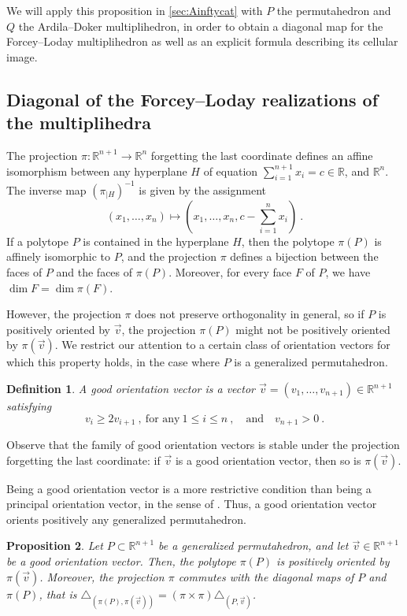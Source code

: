 \documentclass[twoside, 12pt]{amsart}
\newtheorem{definition}{Definition}[section]
\newtheorem{proposition}[definition]{Proposition}
\theoremstyle{remark}
\newcommand{\RR}{\mathbb{R}}
\begin{document}
We will apply this proposition in \cref{sec:Ainftycat} with $P$ the permutahedron and $Q$ the Ardila--Doker multiplihedron, in order to obtain a diagonal map for the Forcey--Loday multiplihedron as well as an explicit formula describing its cellular image.


\subsection{Diagonal of the Forcey--Loday realizations of the multiplihedra}
\label{sec:diagonal}

The projection $\pi : \RR^{n+1} \to \RR^n$ forgetting the last coordinate defines an affine isomorphism between any hyperplane $H$ of equation $\sum_{i=1}^{n+1} x_i = c \in \RR$, and $\RR^n$. 
The inverse map $(\pi_{| H})^{-1}$ is given by the assignment \[ (x_1, \ldots, x_n) \mapsto \left(x_1, \ldots, x_n, c- \sum_{i=1}^{n}x_i\right) \ . \]
If a polytope $P$ is contained in the hyperplane $H$, then the polytope $\pi(P)$ is affinely isomorphic to $P$, and the projection $\pi$ defines a bijection between the faces of $P$ and the faces of $\pi(P)$. Moreover, for every face $F$ of $P$, we have $\dim F = \dim \pi(F)$.

However, the projection $\pi$ does not preserve orthogonality in general, so if $P$ is positively oriented by $\vec v$, the projection $\pi(P)$ might not be positively oriented by $\pi(\vec v)$.  
We restrict our attention to a certain class of orientation vectors for which this property holds, in the case where $P$ is a generalized permutahedron.

\begin{definition} 
\label{def:goodvector}
A \emph{good orientation vector} is a vector $\vec v=(v_1, \ldots, v_{n+1})\in \RR^{n+1}$ satisfying \[v_{i}\geqslant2v_{i+1}\ , \ \text{for any}\  1\leqslant i\leqslant n\ , \quad \text{and}\quad  v_{n+1}>0 \ . \]
\end{definition}
Observe that the family of good orientation vectors is stable under the projection forgetting the last coordinate: if $\vec v$ is a good orientation vector, then so is $\pi(\vec v)$.

Being a good orientation vector is a more restrictive condition than being a principal orientation vector, in the sense of \cite[Definition 3.15]{LA21}. Thus, a good orientation vector orients positively any generalized permutahedron. 

\begin{proposition} 
\label{prop:goodprojection}
Let $P \subset \RR^{n+1}$ be a generalized permutahedron, and let $\vec v \in \RR^{n+1}$ be a good orientation vector. 
Then, the polytope $\pi(P)$ is positively oriented by $\pi(\vec v)$. 
Moreover, the projection $\pi$ commutes with the diagonal maps of $P$ and $\pi(P)$, that is $\triangle_{(\pi(P),\pi(\vec v))}=(\pi \times \pi)\triangle_{(P,\vec v)}$.
\end{proposition}
\end{document}
